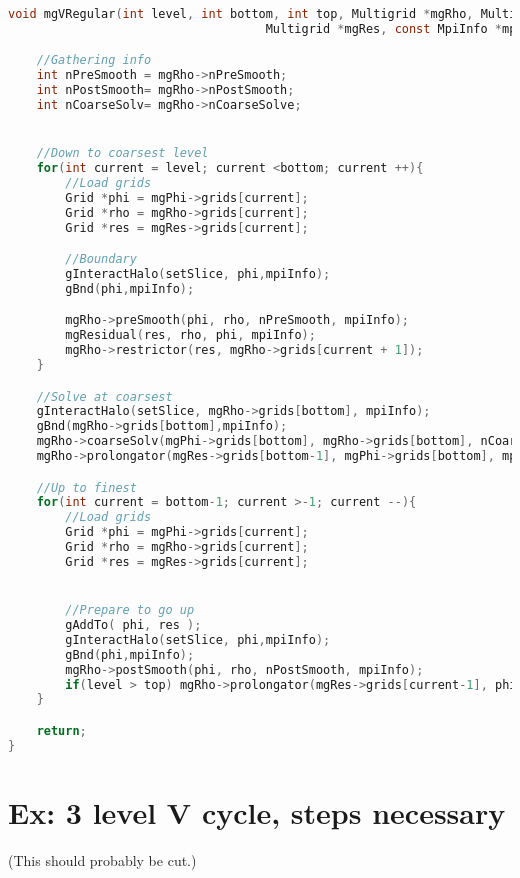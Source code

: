 \newpage
\begin{lstlisting}[language=c, caption = Implementation of an recursive V-cycle]
void mgVRegular(int level, int bottom, int top, Multigrid *mgRho, Multigrid *mgPhi,
 									Multigrid *mgRes, const MpiInfo *mpiInfo){

	//Gathering info
	int nPreSmooth = mgRho->nPreSmooth;
	int nPostSmooth= mgRho->nPostSmooth;
	int nCoarseSolv= mgRho->nCoarseSolve;


	//Down to coarsest level
	for(int current = level; current <bottom; current ++){
		//Load grids
		Grid *phi = mgPhi->grids[current];
		Grid *rho = mgRho->grids[current];
		Grid *res = mgRes->grids[current];

		//Boundary
		gInteractHalo(setSlice, phi,mpiInfo);
		gBnd(phi,mpiInfo);

		mgRho->preSmooth(phi, rho, nPreSmooth, mpiInfo);
		mgResidual(res, rho, phi, mpiInfo);
		mgRho->restrictor(res, mgRho->grids[current + 1]);
	}

	//Solve at coarsest
	gInteractHalo(setSlice, mgRho->grids[bottom], mpiInfo);
	gBnd(mgRho->grids[bottom],mpiInfo);
	mgRho->coarseSolv(mgPhi->grids[bottom], mgRho->grids[bottom], nCoarseSolv, mpiInfo);
	mgRho->prolongator(mgRes->grids[bottom-1], mgPhi->grids[bottom], mpiInfo);

	//Up to finest
	for(int current = bottom-1; current >-1; current --){
		//Load grids
		Grid *phi = mgPhi->grids[current];
		Grid *rho = mgRho->grids[current];
		Grid *res = mgRes->grids[current];


		//Prepare to go up
		gAddTo( phi, res );
		gInteractHalo(setSlice, phi,mpiInfo);
		gBnd(phi,mpiInfo);
		mgRho->postSmooth(phi, rho, nPostSmooth, mpiInfo);
		if(level > top)	mgRho->prolongator(mgRes->grids[current-1], phi, mpiInfo);
	}

	return;
}
\end{lstlisting}



\section{Ex: 3 level V cycle, steps necessary}
	\label{sec:EX_V_Ccyles}

	(This should probably be cut.)

